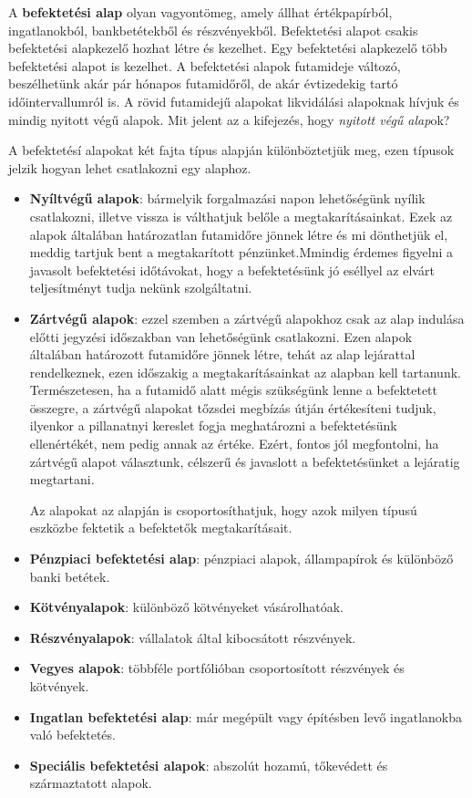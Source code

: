 	A \textbf{befektetési alap} olyan vagyontömeg, amely állhat értékpapírból, ingatlanokból, bankbetétekből és részvényekből. Befektetési alapot csakis befektetési alapkezelő hozhat létre és kezelhet. Egy befektetési alapkezelő több befektetési alapot is kezelhet. A befektetési alapok futamideje változó, beszélhetünk akár pár hónapos futamidőről, de akár évtizedekig tartó időintervallumról is. A rövid futamidejű alapokat likvidálási alapoknak hívjuk és mindig nyitott végű alapok. Mit jelent az a kifejezés, hogy \emph{nyitott végű alap}ok? \cite{wikiInvest}

	A befektetésí alapokat két fajta típus alapján különböztetjük meg, ezen típusok jelzik hogyan lehet csatlakozni egy alaphoz.
\begin{itemize}
\item \textbf{Nyíltvégű alapok}: bármelyik forgalmazási napon lehetőségünk nyílik csatlakozni, illetve vissza is válthatjuk belőle a megtakarításainkat. Ezek az alapok általában határozatlan futamidőre jönnek létre és mi dönthetjük el, meddig tartjuk bent a megtakarított pénzünket.Mmindig érdemes figyelni a javasolt befektetési időtávokat, hogy a befektetésünk jó eséllyel az elvárt teljesítményt tudja nekünk szolgáltatni.
\item \textbf{Zártvégű alapok}: ezzel szemben a zártvégű alapokhoz csak az alap indulása előtti jegyzési időszakban van lehetőségünk csatlakozni. Ezen alapok általában határozott futamidőre jönnek létre, tehát az alap lejárattal rendelkeznek, ezen időszakig a megtakarításainkat az alapban kell tartanunk. Természetesen, ha a futamidő alatt mégis szükségünk lenne a befektetett összegre, a zártvégű alapokat tőzsdei megbízás útján értékesíteni tudjuk, ilyenkor a pillanatnyi kereslet fogja meghatározni a befektetésünk ellenértékét, nem pedig annak az értéke. Ezért, fontos jól megfontolni, ha zártvégű alapot választunk, célszerű és javaslott a befektetésünket a lejáratig megtartani. \cite{OTPInvest}

Az alapokat az alapján is csoportosíthatjuk, hogy azok milyen típusú eszközbe fektetik a befektetők megtakarításait. 

\end{itemize}
\begin{itemize}
\item \textbf{Pénzpiaci befektetési alap}: pénzpiaci alapok, állampapírok és különböző banki betétek.
\item \textbf{Kötvényalapok}: különböző kötvényeket vásárolhatóak.
\item \textbf{Részvényalapok}: vállalatok által kibocsátott részvények.
\item \textbf{Vegyes alapok}: többféle portfólióban csoportosított részvények és  kötvények.
\item \textbf{Ingatlan befektetési alap}: már megépült vagy építésben levő ingatlanokba való befektetés.
\item \textbf{Speciális befektetési alapok}: abszolút hozamú, tőkevédett és származtatott alapok.
\end{itemize}

